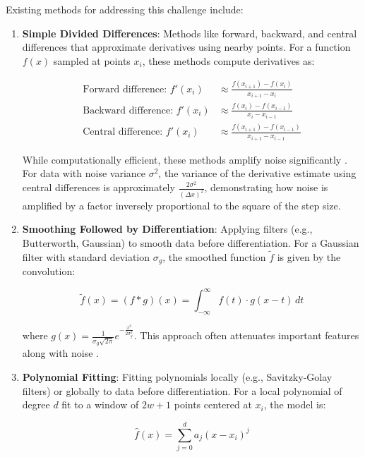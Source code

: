 \documentclass[10pt,journal,compsoc]{IEEEtran}
\begin{document}
Existing methods for addressing this challenge include:

\begin{enumerate}
    \item \textbf{Simple Divided Differences}: Methods like forward, backward, and central differences that approximate derivatives using nearby points. For a function $f(x)$ sampled at points $x_i$, these methods compute derivatives as:
    
    \begin{align}
        \text{Forward difference: } f'(x_i) &\approx \frac{f(x_{i+1}) - f(x_i)}{x_{i+1} - x_i} \\[5pt]
        \text{Backward difference: } f'(x_i) &\approx \frac{f(x_i) - f(x_{i-1})}{x_i - x_{i-1}} \\[5pt]
        \text{Central difference: } f'(x_i) &\approx \frac{f(x_{i+1}) - f(x_{i-1})}{x_{i+1} - x_{i-1}}
    \end{align}
    
    While computationally efficient, these methods amplify noise significantly \cite{kaw2021numerical}. For data with noise variance $\sigma^2$, the variance of the derivative estimate using central differences is approximately $\frac{2\sigma^2}{(\Delta x)^2}$, demonstrating how noise is amplified by a factor inversely proportional to the square of the step size.
    
    \item \textbf{Smoothing Followed by Differentiation}: Applying filters (e.g., Butterworth, Gaussian) to smooth data before differentiation. For a Gaussian filter with standard deviation $\sigma_g$, the smoothed function $\tilde{f}$ is given by the convolution:
    
    \begin{equation}
        \tilde{f}(x) = (f * g)(x) = \int_{-\infty}^{\infty} f(t) \cdot g(x-t) \, dt
    \end{equation}
    
    where $g(x) = \frac{1}{\sigma_g\sqrt{2\pi}}e^{-\frac{x^2}{2\sigma_g^2}}$. This approach often attenuates important features along with noise \cite{ahnert2007numerical}.
    
    \item \textbf{Polynomial Fitting}: Fitting polynomials locally (e.g., Savitzky-Golay filters) or globally to data before differentiation. For a local polynomial of degree $d$ fit to a window of $2w+1$ points centered at $x_i$, the model is:
    
    \begin{equation}
        \hat{f}(x) = \sum_{j=0}^{d} a_j (x - x_i)^j
    \end{equation}
    

\end{enumerate}
\end{document}
